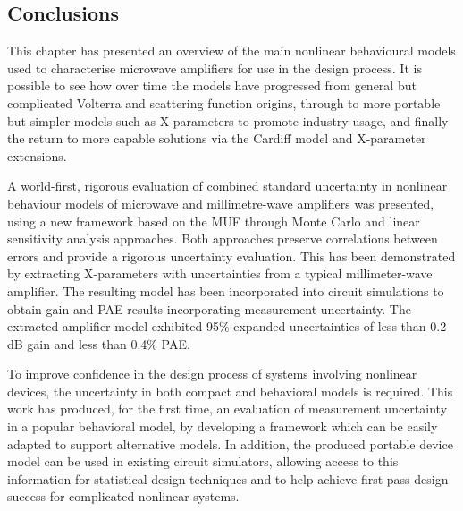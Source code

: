 \documentclass[../thesis/thesis.tex]{subfiles}
\begin{document}
\begin{refsection}
\section{Conclusions}

This chapter has presented an overview of the main nonlinear behavioural models used to characterise microwave amplifiers for use in the design process. It is possible to see how over time the models have progressed from general but complicated Volterra and scattering function origins, through to more portable but simpler models such as X-parameters to promote industry usage, and finally the return to more capable solutions via the Cardiff model and X-parameter extensions.

A world-first, rigorous evaluation of combined standard uncertainty in nonlinear behaviour models of microwave and millimetre-wave amplifiers was presented, using a new framework based on the MUF through Monte Carlo and linear sensitivity analysis approaches. Both approaches preserve correlations between errors and provide a rigorous uncertainty evaluation. This has been demonstrated by extracting X-parameters with uncertainties from a typical millimeter-wave amplifier. The resulting model has been incorporated into circuit simulations to obtain gain and PAE results incorporating measurement uncertainty. The extracted amplifier model exhibited 95\% expanded uncertainties of less than 0.2 dB gain and less than 0.4\% PAE. 

To improve confidence in the design process of systems involving nonlinear devices, the uncertainty in both compact and behavioral models is required. This work has produced, for the first time, an evaluation of measurement uncertainty in a popular behavioral model, by developing a framework which can be easily adapted to support alternative models. In addition, the produced portable device model can be used in existing circuit simulators, allowing access to this information for statistical design techniques and to help achieve first pass design success for complicated nonlinear systems.

\printbibliography[title=References]
\end{refsection}
\end{document}
